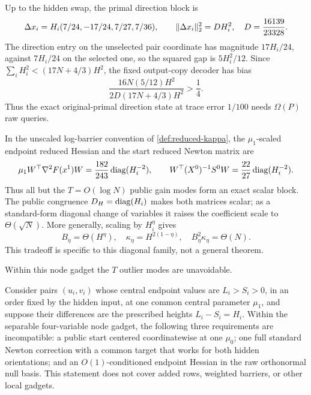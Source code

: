 Up to the hidden swap, the primal direction block is
\begin{equation}
 \Delta x_i=H_i(7/24,-17/24,7/27,7/36),
 \qquad \lVert\Delta x_i\rVert_2^2
 =D H_i^2,\quad D=\frac{16139}{23328}.
\label{eq:lp-tag-9-39}
\end{equation}
The direction entry on the unselected pair coordinate has magnitude
\(17H_i/24\), against \(7H_i/24\) on the selected one, so the squared gap is
\(5H_i^2/12\).  Since
\(\sum_iH_i^2<(17N+4/3)H^2\), the fixed output-copy decoder has bias
\begin{equation}
 \frac{16N(5/12)H^2}{2D(17N+4/3)H^2}>\frac14.
\label{eq:lp-tag-9-40}
\end{equation}
Thus the exact original-primal direction state at trace error \(1/100\)
needs \(\Omega(P)\) raw queries.

In the unscaled log-barrier convention of
\cref{def:reduced-kappa}, the \(\mu_1\)-scaled endpoint reduced Hessian and
the start reduced Newton matrix are
\begin{equation}
 \mu_1 W^\top\nabla^2F(x^1)W
 =\frac{182}{243}\operatorname{diag}(H_i^{-2}),
\qquad
 W^\top(X^0)^{-1}S^0W=\frac{22}{27}\operatorname{diag}(H_i^{-2}).
\end{equation}
Thus all but the \(T=O(\log N)\) public gain modes form an exact scalar
block.  The public congruence \(D_H=\operatorname{diag}(H_i)\) makes both matrices scalar;
as a standard-form diagonal change of variables it raises the coefficient
scale to \(\Theta(\sqrt N)\).  More generally, scaling by \(H_i^\eta\)
gives
\begin{equation}
 B_\eta=\Theta(H^\eta),\quad
 \kappa_\eta=H^{2(1-\eta)},\quad
 B_\eta^2\kappa_\eta=\Theta(N).
\end{equation}
This tradeoff is specific to this diagonal family, not a general theorem.

Within this node gadget the \(T\) outlier modes are unavoidable.

\begin{proposition}
\label{prop:lp-local-incompatibility}
Consider pairs \((u_i,v_i)\) whose central endpoint values are
\(L_i>S_i>0\), in an order fixed by the hidden input, at one
common central parameter \(\mu_1\), and suppose their differences are the
prescribed heights \(L_i-S_i=H_i\).  Within the separable four-variable
node gadget, the following three requirements are incompatible: a public
start centered coordinatewise at one \(\mu_0\); one full standard Newton
correction with a common target that works for both hidden orientations; and
an \(O(1)\)-conditioned endpoint Hessian in the raw orthonormal null basis.
This statement does not cover added rows, weighted barriers, or other local
gadgets.
\end{proposition}

